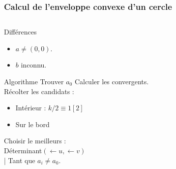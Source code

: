 \documentclass{beamer}
\begin{document}
\begin{frame}
\frametitle{Calcul de l'enveloppe convexe d'un cercle}
\begin{columns}[t]
  \begin{column}{4cm}
 
  \begin{block}{Différences}
    \begin{itemize}
      \item $a\ne (0, 0)$.
      \item $b$ inconnu.
    \end{itemize}
  \end{block}
 
    \begin{block}{Algorithme}
    Trouver $a_0$
    Calculer les convergents.\\
    Récolter les candidats :
    \begin{itemize}
      \item Intérieur : $k / 2 \equiv 1 [2]$
      \item Sur le bord
    \end{itemize}
    Choisir le meilleurs :\\
    \alert{Déterminant$(\leftarrow{u}, \leftarrow{v})$}\\
    | Tant que $ a_{i} \ne a_0$.
 
  \end{block}
    
  \end{column}


\end{columns}
\end{frame}
\end{document}
